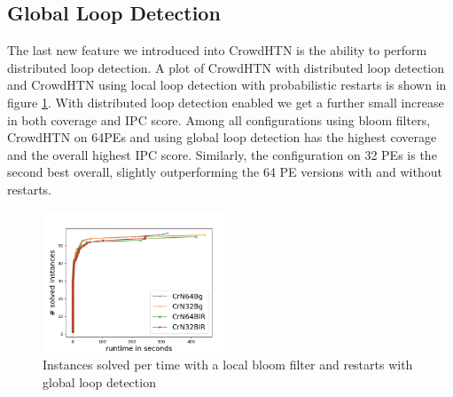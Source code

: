 \subsection{Global Loop Detection}
\label{eval: global loop}
The last new feature we introduced into CrowdHTN is the ability to perform distributed loop detection. A plot of CrowdHTN with distributed loop detection and CrowdHTN using local loop detection with probabilistic restarts is shown in figure \ref{figure: global loops}. With distributed loop detection enabled we get a further small increase in both coverage and IPC score. Among all configurations using bloom filters, CrowdHTN on 64PEs and using global loop detection has the highest coverage and the overall highest IPC score. Similarly, the configuration on 32 PEs is the second best overall, slightly outperforming the 64 PE versions with and without restarts.

\begin{figure}[!hbp]
	\caption{Instances solved per time with a local bloom filter and restarts with global loop detection}
	\label{figure: global loops}
	\centering
	\includegraphics[width=0.5\textwidth]{images/final/global_loops}
\end{figure}

